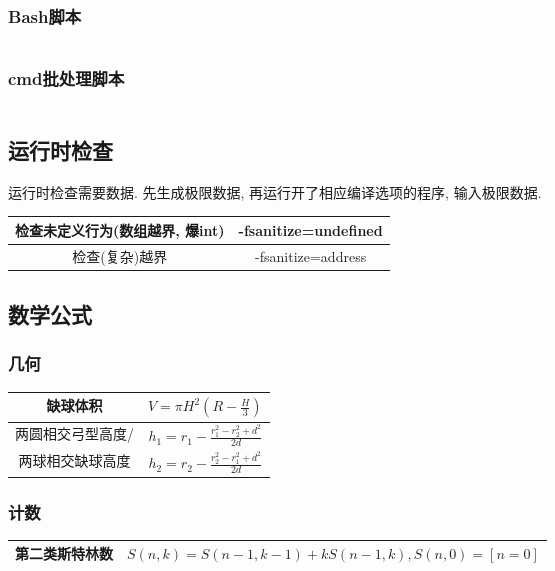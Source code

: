 \documentclass[utf8]{ctexart}
\begin{document}
\subsubsection{Bash脚本}
\inputminted[linenos,breaklines,tabsize=4,mathescape,texcl]{sh}{codes/check-bash.sh}

\subsubsection{cmd批处理脚本}
\inputminted[linenos,breaklines,tabsize=4,mathescape,texcl]{bat}{codes/check-bat.bat}

\subsection{运行时检查}

运行时检查需要数据. 先生成极限数据, 再运行开了相应编译选项的程序, 输入极限数据.

\begin{spacing}{2}
\begin{center}
\begin{tabular}{ |c|c| }
	\hline
	检查未定义行为(数组越界, 爆int)	& -fsanitize=undefined		\\
	\hline
	检查(复杂)越界					& -fsanitize=address		\\
	\hline
\end{tabular}
\end{center}
\end{spacing}

\subsection{数学公式}

\subsubsection{几何}

\begin{spacing}{2}
\begin{center}
\begin{tabular}{ |c|c| }
	\hline
	缺球体积				& $V = \pi H^2\left(R-\frac{H}{3}\right)$		\\
	\hline
	两圆相交弓型高度/		& $h_1 = r_1 - \frac{r_1^2 - r_2^2 + d^2}{2d}$	\\
	两球相交缺球高度		& $h_2 = r_2 - \frac{r_2^2 - r_1^2 + d^2}{2d}$	\\
	\hline
\end{tabular}
\end{center}
\end{spacing}

\subsubsection{计数}

\begin{spacing}{2}
\begin{center}
\begin{tabular}{ |c|c| }
	\hline
	第二类斯特林数				& $S(n, k) = S(n-1, k-1) + k S(n-1, k), S(n, 0) = [n = 0]$		\\
	\hline
\end{tabular}
\end{center}
\end{spacing}
\end{document}
